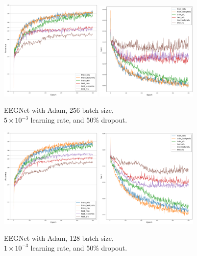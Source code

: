 	\begin{figure}[H]
		\centering
		\includegraphics[width=0.45\textwidth]{results/eegnet_adam_256_0.005_0.5_acc.png}
		\includegraphics[width=0.45\textwidth]{results/eegnet_adam_256_0.005_0.5_loss.png}
		\caption{EEGNet with Adam, 256 batch size, \\ $5 \times 10^{-3}$ learning rate, and 50\% dropout.}
   	\end{figure}
	\begin{figure}[H]
		\centering
		\includegraphics[width=0.45\textwidth]{results/eegnet_adam_128_0.001_0.5_acc.png}
		\includegraphics[width=0.45\textwidth]{results/eegnet_adam_128_0.001_0.5_loss.png}
		\caption{EEGNet with Adam, 128 batch size, \\ $1 \times 10^{-3}$ learning rate, and 50\% dropout.}
   	\end{figure}
